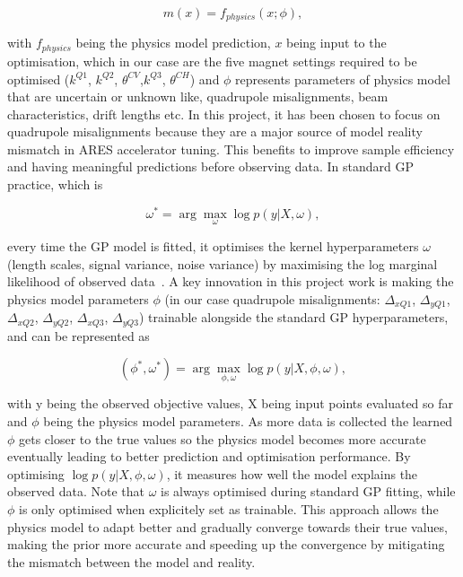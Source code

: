 \begin{equation}
    \label{eq_physics_prior}
    m(x) = f_{physics}(x; \phi),
\end{equation}

with $f_{physics}$ being the physics model prediction, $x$ being input to the optimisation, which in our case are the five magnet settings required to be optimised ($k^{Q1}$, $k^{Q2}$, $\theta^{CV}$,$k^{Q3}$, $\theta^{CH}$) 
and $\phi$ represents parameters of physics model that are uncertain or unknown like, quadrupole misalignments, beam characteristics, drift lengths etc. In this project, it has been chosen to focus on quadrupole misalignments because they are a major source of model reality mismatch in ARES accelerator tuning.
This benefits to improve sample efficiency and having meaningful predictions before observing data. 
In standard GP practice, which is


\begin{equation}
    \label{eq_bo_kernel_hyperparameters}
    \omega^* = \arg\max_\omega \log p(y | X, \omega),
\end{equation}

every time the GP model is fitted, it optimises the kernel hyperparameters $\omega$ (length scales, signal variance,
noise variance) by maximising the log marginal likelihood of observed data~\cite{williams2006gaussian}. A key innovation in this project work is making the physics model parameters $\phi$ (in our case quadrupole misalignments: $\Delta_{xQ1}$, $\Delta_{yQ1}$, $\Delta_{xQ2}$, $\Delta_{yQ2}$, $\Delta_{xQ3}$, $\Delta_{yQ3}$) trainable alongside the standard GP hyperparameters, and can be represented as 


\begin{equation}
    \label{eq_bo_physics_parameters}
    (\phi^*, \omega^*) = \arg\max_{\phi, \omega} \log p(y | X, \phi, \omega),
\end{equation}

with y being the observed objective values, X being input points evaluated so far and $\phi$ being the physics model parameters. As more data is collected the learned $\phi$ gets closer to the true values so the physics model becomes more accurate eventually leading to better prediction and optimisation performance. 
By optimising $\log p(y | X, \phi, \omega)$, it measures how well the model explains the observed data. 
Note that $\omega$ is always optimised during standard GP fitting, while $\phi$ is only optimised when explicitely set as trainable. This approach allows the physics model to adapt better and gradually converge towards their true values, making the prior more accurate and speeding up the convergence by mitigating the mismatch between the model and reality.




